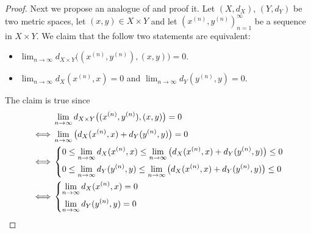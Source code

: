 \begin{proof}
  Next we propose an analogue of  and proof it.
  Let \((X, d_X)\), \((Y, d_Y)\) be two metric spaces, let \((x, y) \in X \times Y\) and let \((x^{(n)}, y^{(n)})_{n = 1}^\infty\) be a sequence in \(X \times Y\).
  We claim that the follow two statements are equivalent:
  \begin{itemize}
    \item \(\lim_{n \to \infty} d_{X \times Y}\big((x^{(n)}, y^{(n)}), (x, y)\big) = 0\).
    \item \(\lim_{n \to \infty} d_X(x^{(n)}, x) = 0\) and \(\lim_{n \to \infty} d_Y(y^{(n)}, y) = 0\).
  \end{itemize}
  The claim is true since
  \begin{align*}
         & \lim_{n \to \infty} d_{X \times Y}\big((x^{(n)}, y^{(n)}), (x, y)\big) = 0                                             \\
    \iff & \lim_{n \to \infty} \big(d_X(x^{(n)}, x) + d_Y(y^{(n)}, y)\big) = 0                                                    \\
    \iff & \begin{dcases}
             0 \leq \lim_{n \to \infty} d_X(x^{(n)}, x) \leq \lim_{n \to \infty} \big(d_X(x^{(n)}, x) + d_Y(y^{(n)}, y)\big) \leq 0 \\
             0 \leq \lim_{n \to \infty} d_Y(y^{(n)}, y) \leq \lim_{n \to \infty} \big(d_X(x^{(n)}, x) + d_Y(y^{(n)}, y)\big) \leq 0
           \end{dcases} \\
    \iff & \begin{dcases}
             \lim_{n \to \infty} d_X(x^{(n)}, x) = 0 \\
             \lim_{n \to \infty} d_Y(y^{(n)}, y) = 0
           \end{dcases}
  \end{align*}


\end{proof}
